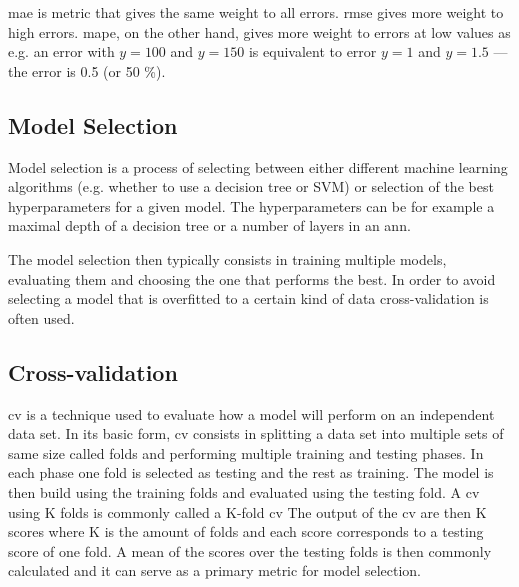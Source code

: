 \acrshort{mae} is metric that gives the same weight to all errors.
\Acrshort{rmse} gives more weight to high errors.
\Acrshort{mape}, on the other hand, gives more weight to errors at low values as e.g. an error with $y=100$ and $y=150$ is equivalent to error $y=1$ and $y=1.5$ --- the error is 0.5 (or 50 \%).

\subsection{Model Selection}

Model selection is a process of selecting between either different machine learning algorithms (e.g. whether to use a decision tree or SVM) or selection of the best hyperparameters for a given model.
The hyperparameters can be for example a maximal depth of a decision tree or a number of layers in an \acrshort{ann}.

The model selection then typically consists in training multiple models, evaluating them and choosing the one that performs the best.
In order to avoid selecting a model that is overfitted to a certain kind of data cross-validation is often used.

\subsection{Cross-validation}
\Acrfull{cv} is a technique used to evaluate how a model will perform on an independent data set.
In its basic form, \acrshort{cv} consists in splitting a data set into multiple sets of same size called folds and performing multiple training and testing phases.
In each phase one fold is selected as testing and the rest as training.
The model is then build using the training folds and evaluated using the testing fold.
A \acrshort{cv} using K folds is commonly called a K-fold \acrshort{cv}
The output of the \acrshort{cv} are then K scores where K is the amount of folds and each score corresponds to a testing score of one fold.
A mean of the scores over the testing folds is then commonly calculated and it can serve as a primary metric for model selection.
